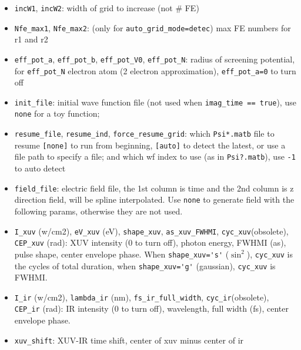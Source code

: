 \begin{itemize}
\item \verb`incW1`, \verb`incW2`: width of grid to increase (not # FE)
\item \verb`Nfe_max1`, \verb`Nfe_max2`: (only for \verb`auto_grid_mode=detec`) max FE numbers for r1 and r2
\item \verb`eff_pot_a`, \verb`eff_pot_b`, \verb`eff_pot_V0`, \verb`eff_pot_N`: radius of screening potential, for \verb`eff_pot_N` electron atom (2 electron approximation), \verb`eff_pot_a=0` to turn off
\item \verb`init_file`: initial wave function file (not used when \verb`imag_time == true`), use \verb`none` for a toy function;
\item \verb`resume_file`, \verb`resume_ind`, \verb`force_resume_grid`: which \verb`Psi*.matb` file to resume \verb`[none]` to run from beginning, \verb`[auto]` to detect the latest, or use a file path to specify a file; and which wf index to use (as in \verb`Psi?.matb`), use \verb`-1` to auto detect
\item \verb`field_file`: electric field file, the 1st column is time and the 2nd column is z direction field, will be spline interpolated. Use \verb`none` to generate field with the following params, otherwise they are not used.
\item \verb`I_xuv` (w/cm2), \verb`eV_xuv` (eV), \verb`shape_xuv`, \verb`as_xuv_FWHMI`, \verb`cyc_xuv`(obsolete), \verb`CEP_xuv` (rad): XUV intensity (0 to turn off), photon energy, FWHMI (as), pulse shape, center envelope phase. When \verb`shape_xuv='s'` ($\sin^2$), \verb`cyc_xuv` is the cycles of total duration, when \verb`shape_xuv='g'` (gaussian), \verb`cyc_xuv` is FWHMI.
\item \verb`I_ir` (w/cm2), \verb`lambda_ir` (nm), \verb`fs_ir_full_width`, \verb`cyc_ir`(obsolete), \verb`CEP_ir` (rad): IR intensity (0 to turn off), wavelength, full width (fs), center envelope phase.
\item \verb`xuv_shift`: XUV-IR time shift, center of xuv minus center of ir
\end{itemize}
